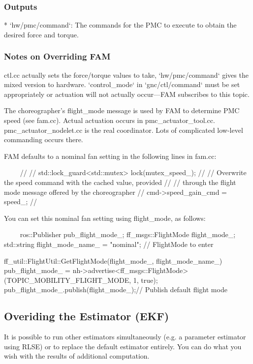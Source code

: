 \documentclass{article}
\begin{document}
\subsubsection{Outputs}
\begin{markdown}
* `hw/pmc/command`: The commands for the PMC to execute to obtain the desired force and torque.
\end{markdown}

\subsubsection{Notes on Overriding FAM}
\begin{markdown}
ctl.cc actually sets the force/torque values to take, `hw/pmc/command` gives the mixed version to hardware. `control_mode` in `gnc/ctl/command` must be set appropriately or actuation will not actually occur---FAM subscribes to this topic.


The choreographer's flight\_mode message is used by FAM to determine PMC speed (see fam.cc). Actual actuation occurs in pmc\_actuator\_tool.cc. pmc\_actuator\_nodelet.cc is the real coordinator. Lots of complicated low-level commanding occurs there.

FAM defaults to a nominal fan setting in the following lines in fam.cc:

~~~~
// {
//   std::lock_guard<std::mutex> lock(mutex_speed_);
//   // Overwrite the speed command with the cached value, provided
//   // through the flight mode message offered by the choreographer
//   cmd->speed_gain_cmd = speed_;
// }
 ~~~~
 
You can set this nominal fan setting using flight\_mode, as follows:

~~~~
ros::Publisher pub_flight_mode_;
ff_msgs::FlightMode flight_mode_;
std::string flight_mode_name_ = "nominal";  // FlightMode to enter

ff_util::FlightUtil::GetFlightMode(flight_mode_, flight_mode_name_)
pub_flight_mode_ = nh->advertise<ff_msgs::FlightMode>(TOPIC_MOBILITY_FLIGHT_MODE, 1, true);
pub_flight_mode_.publish(flight_mode_);// Publish default flight mode
~~~~
\end{markdown}

\subsection{Overiding the Estimator (EKF)}

It is possible to run other estimators simultaneously (e.g. a parameter estimator using RLSE) or to replace the default estimator entirely. You can do what you wish with the results of additional computation.
\end{document}
